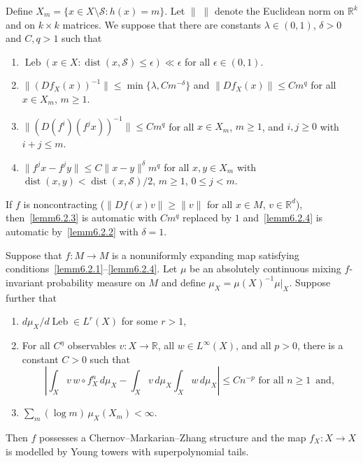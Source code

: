 \documentclass[AHL,Unicode,longabstracts,published]{cedram}
\newcommand{\R}{\mathbb{R}}
\newcommand{\cS}{\mathcal{S}}
\DeclareMathOperator{\Leb}{Leb}
\DeclareMathOperator{\dist}{dist}
\newcommand{\eps}{\epsilon}
\newcommand*{\romanenumi}{\renewcommand*{\theenumi}{\roman{enumi}}}
\begin{document}
Define $X_m=\{x\in X\setminus\cS:h(x)=m\}$. Let $\|\;\|$ denote the Euclidean norm on $\R^k$ and on $k\times k$ matrices. We suppose that there are constants $\lambda\in(0,1)$, $\delta>0$ and $C,q>1$ such that
\begin{enumerate}\romanenumi
\item \label{lemm6.2.1}$\Leb(x\in X:\dist(x,\cS)\le\eps)\ll \eps$ for all $\eps\in(0,1)$.
\item \label{lemm6.2.2}$\|(Df_X(x))^{-1}\|\le\min\{\lambda,Cm^{-\delta}\}$ and $\|Df_X(x)\|\le Cm^q$ for all $x\in X_m$, $m\ge1$.
\item \label{lemm6.2.3}$\|(D(f^i)(f^jx))^{-1}\|\le Cm^q$ for all $x\in X_m$, $m\ge1$, and $i,j\ge0$ with $i+j\le m$.
\item \label{lemm6.2.4}$\|f^jx-f^jy\|\le C\|x-y\|^\delta m^q$ for all $x,y\in X_m$ with $\dist(x,y)<\dist(x,\cS)/2$, $m\ge1$, $0\le j<m$.
\end{enumerate}

\begin{rema}\label{rmk:NUE}
If $f$ is noncontracting ($\|Df(x)v\|\ge\|v\|$ for all $x\in M$, $v\in\R^d$), then~\eqref{lemm6.2.3} is automatic with $Cm^q$ replaced by $1$ and~\eqref{lemm6.2.4} is automatic by~\eqref{lemm6.2.2} with $\delta=1$.
\end{rema}

\begin{lemm}\label{lem:NUE}
Suppose that $f:M\to M$ is a nonuniformly expanding map satisfying conditions~\eqref{lemm6.2.1}--\eqref{lemm6.2.4}. Let $\mu$ be an absolutely continuous mixing $f$-invariant probability measure on $M$ and define $\mu_X=\mu(X)^{-1}\mu|_X$. Suppose further that
\begin{enumerate}\romanenumi
\setcounter{enumi}{4}
\item \label{lemm6.2.5}$d\mu_X/d\Leb\in L^r(X)$ for some $r>1$,
\item \label{lemm6.2.6}For all $C^\eta$ observables $v:X\to\R$, all $w\in L^\infty(X)$, and all $p>0$, there is a constant $C>0$ such that
\[
\left|\int_X v\,w\circ f_X^n\,d\mu_X-\int_X v\,d\mu_X\int_X w\,d\mu_X\right|\le Cn^{-p}\text{ for all }n\ge1\,\text{ and},
\]

\item \label{lemm6.2.7}$\sum_m (\log m)\,\mu_X(X_m)<\infty$.
\end{enumerate}

Then $f$ possesses a Chernov--Markarian--Zhang structure and the map $f_X:X\to X$ is modelled by Young towers with superpolynomial tails.
\end{lemm}
\end{document}
